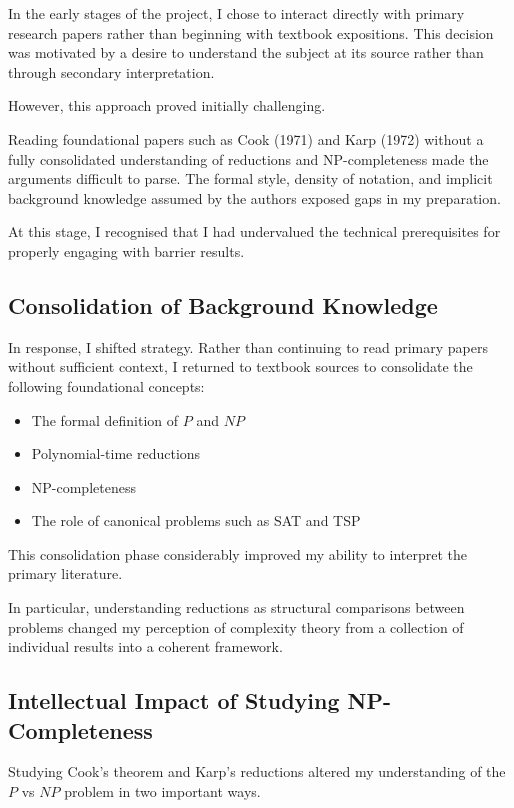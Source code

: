\documentclass[12pt]{article}
\begin{document}
In the early stages of the project, I chose to interact directly with primary research papers rather than beginning with textbook expositions. 
This decision was motivated by a desire to understand the subject at its source rather than through secondary interpretation.

However, this approach proved initially challenging.

Reading foundational papers such as Cook (1971) and Karp (1972) without a fully consolidated understanding of reductions and NP-completeness made the arguments difficult to parse. 
The formal style, density of notation, and implicit background knowledge assumed by the authors exposed gaps in my preparation.

At this stage, I recognised that I had undervalued the technical prerequisites for properly engaging with barrier results.

\subsection{Consolidation of Background Knowledge}

In response, I shifted strategy. 
Rather than continuing to read primary papers without sufficient context, I returned to textbook sources to consolidate the following foundational concepts:

\begin{itemize}
\item The formal definition of $P$ and $NP$
\item Polynomial-time reductions
\item NP-completeness
\item The role of canonical problems such as SAT and TSP
\end{itemize}

This consolidation phase considerably improved my ability to interpret the primary literature.

In particular, understanding reductions as structural comparisons between problems changed my perception of complexity theory from a collection of individual results into a coherent framework.

\subsection{Intellectual Impact of Studying NP-Completeness}

Studying Cook's theorem and Karp's reductions altered my understanding of the $P$ vs $NP$ problem in two important ways.
\end{document}
